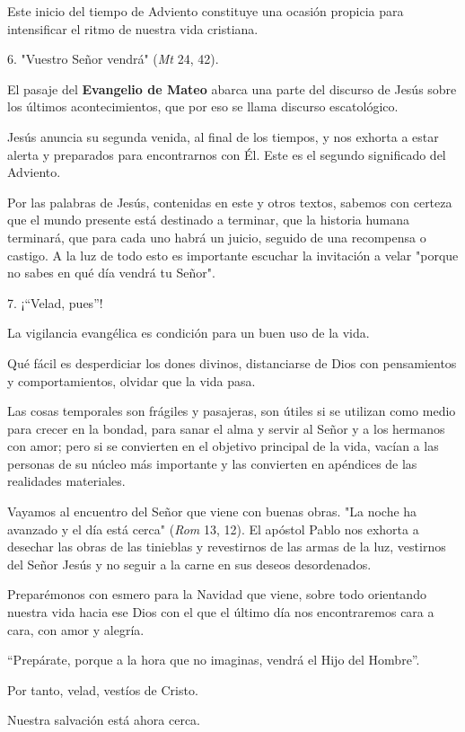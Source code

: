 Este inicio del tiempo de Adviento constituye una ocasión propicia para
intensificar el ritmo de nuestra vida cristiana.

6. "Vuestro Señor vendrá" (\emph{Mt} 24, 42).

El pasaje del \textbf{Evangelio de Mateo} abarca una parte del discurso
de Jesús sobre los últimos acontecimientos, que por eso se llama
discurso escatológico.

Jesús anuncia su segunda venida, al final de los tiempos, y nos exhorta
a estar alerta y preparados para encontrarnos con Él. Este es el segundo
significado del Adviento.

Por las palabras de Jesús, contenidas en este y otros textos, sabemos
con certeza que el mundo presente está destinado a terminar, que la
historia humana terminará, que para cada uno habrá un juicio, seguido de
una recompensa o castigo. A la luz de todo esto es importante escuchar
la invitación a velar "porque no sabes en qué día vendrá tu Señor".

7. ¡``Velad, pues''!

La vigilancia evangélica es condición para un buen uso de la vida.

Qué fácil es desperdiciar los dones divinos, distanciarse de Dios con
pensamientos y comportamientos, olvidar que la vida pasa.

Las cosas temporales son frágiles y pasajeras, son útiles si se utilizan
como medio para crecer en la bondad, para sanar el alma y servir al
Señor y a los hermanos con amor; pero si se convierten en el objetivo
principal de la vida, vacían a las personas de su núcleo más importante
y las convierten en apéndices de las realidades materiales.

Vayamos al encuentro del Señor que viene con buenas obras. "La noche ha
avanzado y el día está cerca" (\emph{Rom} 13, 12). El apóstol Pablo nos
exhorta a desechar las obras de las tinieblas y revestirnos de las armas
de la luz, vestirnos del Señor Jesús y no seguir a la carne en sus
deseos desordenados.

Preparémonos con esmero para la Navidad que viene, sobre todo orientando
nuestra vida hacia ese Dios con el que el último día nos encontraremos
cara a cara, con amor y alegría.

``Prepárate, porque a la hora que no imaginas, vendrá el Hijo del Hombre''.

Por tanto, velad, vestíos de Cristo.

Nuestra salvación está ahora cerca.

